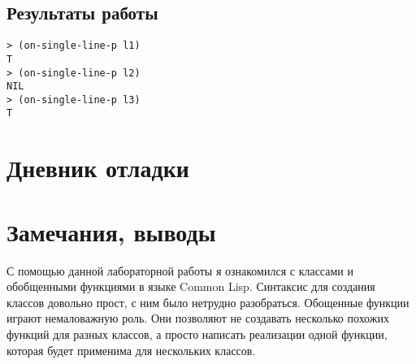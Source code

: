 \documentclass[a4paper, 12pt]{article}
\begin{document}
\subsection{Результаты работы}
\begin{lstlisting}
> (on-single-line-p l1)
T
> (on-single-line-p l2)
NIL
> (on-single-line-p l3)
T
\end{lstlisting}


\section{Дневник отладки}

\section{Замечания, выводы}
С помощью данной лабораторной работы я ознакомился с классами и обобщенными функциями в языке Common Lisp. Синтаксис для создания классов довольно прост, с ним было нетрудно разобраться. Обощенные функции играют немаловажную роль. Они позволяют не создавать несколько похожих функций для разных классов, а просто написать реализации одной функции, которая будет применима для нескольких классов.
\end{document}
